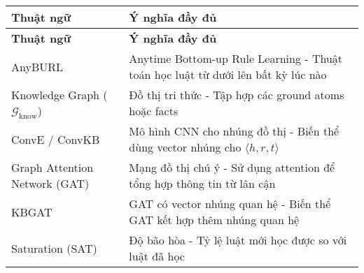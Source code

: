 \begin{center}
	\begin{longtable}{|p{5cm}|p{10cm}|}
		\hline
		\textbf{Thuật ngữ} & \textbf{Ý nghĩa đầy đủ} \\
		\hline
		\endfirsthead
		
		\hline
		\textbf{Thuật ngữ} & \textbf{Ý nghĩa đầy đủ} \\
		\hline
		\endhead
		
		\hline
		\endfoot
		
		\hline
		\endlastfoot
		
		AnyBURL & Anytime Bottom-up Rule Learning - Thuật toán học luật từ dưới lên bất kỳ lúc nào \\
		\hline
		
		Knowledge Graph ($\mathcal{G}_{\text{know}}$) & Đồ thị tri thức - Tập hợp các ground atoms hoặc facts \\
		
		\hline
		
		ConvE / ConvKB & Mô hình CNN cho nhúng đồ thị - Biến thể dùng vector nhúng cho $\langle h, r, t \rangle$ \\
		\hline
		
		Graph Attention Network (GAT) & Mạng đồ thị chú ý - Sử dụng attention để tổng hợp thông tin từ lân cận \\
		\hline
		
		KBGAT & GAT có vector nhúng quan hệ - Biến thể GAT kết hợp thêm nhúng quan hệ \\
		\hline
		
		Saturation (SAT) & Độ bão hòa - Tỷ lệ luật mới học được so với luật đã học \\
		\hline
	\end{longtable}
\end{center}

\pagebreak
